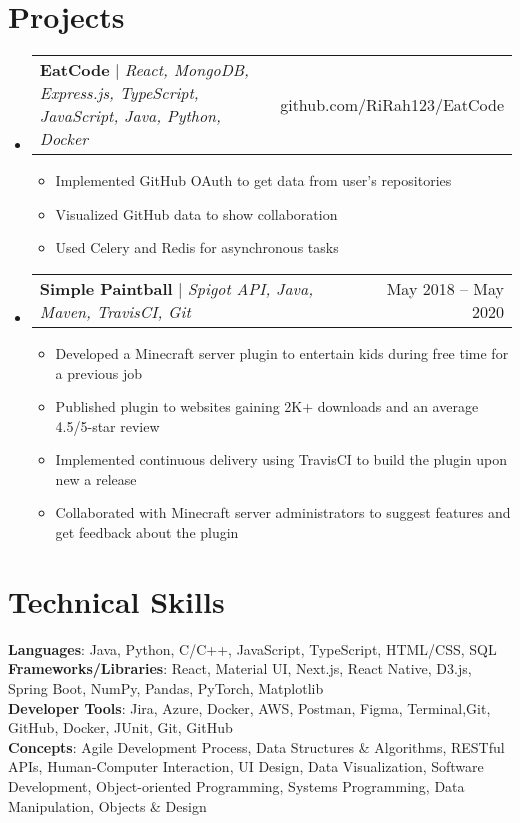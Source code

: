 \documentclass[letterpaper,10pt]{article}
\makeatletter
\newcommand{\resumeItem}[1]{
  \item\small{
    {#1 \vspace{-2pt}}
  }
}
\newcommand{\resumeProjectHeading}[2]{
    \item
    \begin{tabular*}{0.97\textwidth}{l@{\extracolsep{\fill}}r}
      \small#1 & #2 \\
    \end{tabular*}\vspace{-7pt}
}
\newcommand{\resumeSubHeadingListStart}{\begin{itemize}[leftmargin=0.15in, label={}]}
\newcommand{\resumeSubHeadingListEnd}{\end{itemize}}
\newcommand{\resumeItemListStart}{\begin{itemize}}
\newcommand{\resumeItemListEnd}{\end{itemize}\vspace{-5pt}}
\makeatother
\begin{document}
\section{Projects}
    \resumeSubHeadingListStart
      \resumeProjectHeading
          {\textbf{EatCode} $|$ \emph{React, MongoDB, Express.js, TypeScript, JavaScript, Java, Python, Docker}}{github.com/RiRah123/EatCode}
          \resumeItemListStart
            \resumeItem{Implemented GitHub OAuth to get data from user’s repositories}
            \resumeItem{Visualized GitHub data to show collaboration}
            \resumeItem{Used Celery and Redis for asynchronous tasks}
          \resumeItemListEnd
      \resumeProjectHeading
          {\textbf{Simple Paintball} $|$ \emph{Spigot API, Java, Maven, TravisCI, Git}}{May 2018 -- May 2020}
          \resumeItemListStart
            \resumeItem{Developed a Minecraft server plugin to entertain kids during free time for a previous job}
            \resumeItem{Published plugin to websites gaining 2K+ downloads and an average 4.5/5-star review}
            \resumeItem{Implemented continuous delivery using TravisCI to build the plugin upon new a release}
            \resumeItem{Collaborated with Minecraft server administrators to suggest features and get feedback about the plugin}
          \resumeItemListEnd
    \resumeSubHeadingListEnd



%
\section{Technical Skills}
\begin{itemize}[leftmargin=0.15in, label={}]
    \small{\item{
        \textbf{Languages}{: Java, Python, C/C++, JavaScript, TypeScript, HTML/CSS, SQL} \\
        \textbf{Frameworks/Libraries}{: React, Material UI, Next.js, React Native, D3.js, Spring Boot, NumPy, Pandas, PyTorch, Matplotlib} \\
        \textbf{Developer Tools}{: Jira, Azure, Docker, AWS, Postman, Figma, Terminal,Git, GitHub, Docker, JUnit, Git, GitHub} \\
        \textbf{Concepts}{: Agile Development Process, Data Structures \& Algorithms, RESTful APIs, Human-Computer Interaction, UI Design, Data Visualization, Software Development, Object-oriented Programming, Systems Programming, Data Manipulation, Objects \& Design} \\
        }}
\end{itemize}



\end{document}
